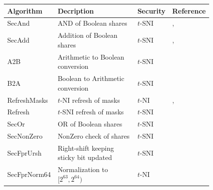 \documentclass[runningheads]{llncs}
\begin{document}
    \begin{figure}[h!]
        \begin{center}
            \begin{tabular}{C{2.5 cm} || C{6 cm} C{1.2cm} C{2cm}}
                \hline \textbf{Algorithm} & \textbf{Decription} & \textbf{Security} & \textbf{Reference}\\
                \hline SecAnd   & AND of Boolean shares             & $t$-SNI &  \cite{ishai2003private}, \cite{barthe2016strong}\\
                 SecAdd         & Addition of Boolean shares        & $t$-SNI&  \cite{coron2015conversion}, \cite{barthe2018masking}\\
                 A2B            & Arithmetic to Boolean conversion  & $t$-SNI& \cite{schneider2019efficiently}\\
                 B2A            & Boolean to Arithmetic conversion  & $t$-SNI&  \cite{bettale2018improved}\\
                 RefreshMasks   & $t$-NI refresh of masks           & $t$-NI&  \cite{barthe2016strong}, \cite{bettale2018improved}\\
                 Refresh        & $t$-SNI refresh of masks          & $t$-SNI& \cite{barthe2016strong}\\
                 SecOr          & OR of Boolean shares              & $t$-SNI&  \cite{Chen_Chen_2024}\\
                 SecNonZero     & NonZero check of shares           & $t$-SNI&  \cite{Chen_Chen_2024}\\
                 SecFprUrsh     & Right-shift keeping sticky bit updated  & $t$-SNI&  \cite{Chen_Chen_2024}\\
                 SecFprNorm64   & Normalization to $[2^{63},2^{64})$ & $t$-NI& \cite{Chen_Chen_2024}\\
                \hline
            \end{tabular}
        \end{center}
    \end{figure}
\end{document}
